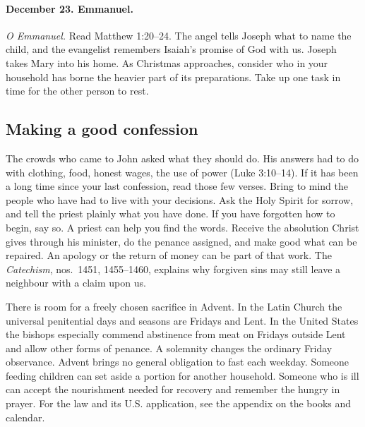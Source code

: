 \paragraph{December 23. Emmanuel.} \emph{O Emmanuel.} Read Matthew 1:20--24. The angel tells Joseph what to name the child, and the evangelist remembers Isaiah's promise of God with us. Joseph takes Mary into his home. As Christmas approaches, consider who in your household has borne the heavier part of its preparations. Take up one task in time for the other person to rest.

\subsection{Making a good confession}

The crowds who came to John asked what they should do. His answers had to do with clothing, food, honest wages, the use of power (Luke 3:10--14). If it has been a long time since your last confession, read those few verses. Bring to mind the people who have had to live with your decisions. Ask the Holy Spirit for sorrow, and tell the priest plainly what you have done. If you have forgotten how to begin, say so. A priest can help you find the words. Receive the absolution Christ gives through his minister, do the penance assigned, and make good what can be repaired. An apology or the return of money can be part of that work. The \emph{Catechism}, nos.~1451, 1455--1460, explains why forgiven sins may still leave a neighbour with a claim upon us.

There is room for a freely chosen sacrifice in Advent. In the Latin Church the universal penitential days and seasons are Fridays and Lent. In the United States the bishops especially commend abstinence from meat on Fridays outside Lent and allow other forms of penance. A solemnity changes the ordinary Friday observance. Advent brings no general obligation to fast each weekday. Someone feeding children can set aside a portion for another household. Someone who is ill can accept the nourishment needed for recovery and remember the hungry in prayer. For the law and its U.S. application, see the appendix on the books and calendar.
